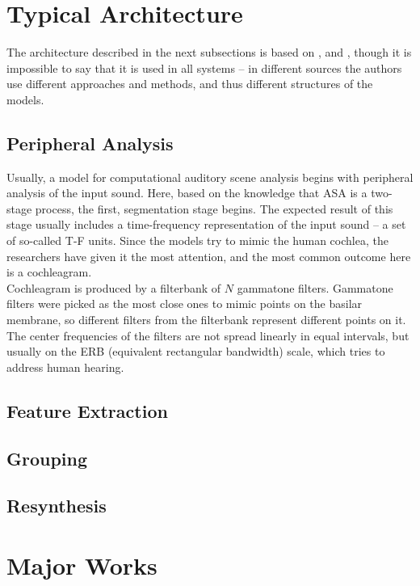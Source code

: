 \section{Typical Architecture}

The architecture described in the next subsections is based on \cite{Wang2006}, \cite{Jasti2020} and \cite{Virtanen2012}, though it is impossible to say that it is used in all systems -- in different sources the authors use different approaches and methods, and thus different structures of the models.

\subsection{Peripheral Analysis}

Usually, a model for computational auditory scene analysis begins with peripheral analysis of the input sound. Here, based on the knowledge that ASA is a two-stage process, the first, segmentation stage begins. The expected result of this stage usually includes a time-frequency representation of the input sound -- a set of so-called T-F units. Since the models try to mimic the human cochlea, the researchers have given it the most attention, and the most common outcome here is a cochleagram.\\

Cochleagram is produced by a filterbank of $N$ gammatone filters. Gammatone filters were picked as the most close ones to mimic points on the basilar membrane, so different filters from the filterbank represent different points on it. The center frequencies of the filters are not spread linearly in equal intervals, but usually on the ERB (equivalent rectangular bandwidth) scale, which tries to address human hearing.

\subsection{Feature Extraction}
\subsection{Grouping}
\subsection{Resynthesis}



\section{Major Works}

